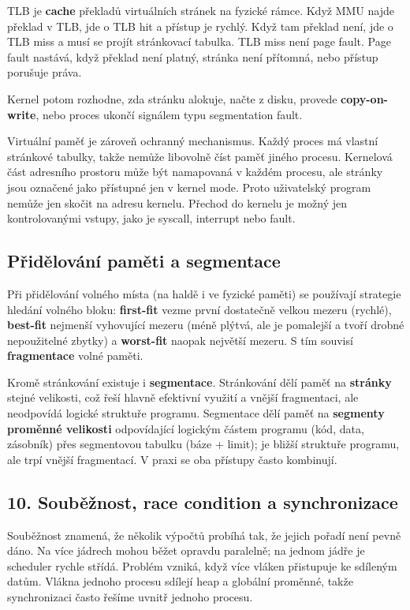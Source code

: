 TLB je \textbf{cache} překladů virtuálních stránek na fyzické rámce. Když MMU najde překlad v TLB, jde o TLB hit a přístup je rychlý. Když tam překlad není, jde o TLB miss a musí se projít stránkovací tabulka. TLB miss není page fault. Page fault nastává, když překlad není platný, stránka není přítomná, nebo přístup porušuje práva.

Kernel potom rozhodne, zda stránku alokuje, načte z disku, provede \textbf{copy-on-write}, nebo proces ukončí signálem typu segmentation fault.

Virtuální paměť je zároveň ochranný mechanismus. Každý proces má vlastní stránkové tabulky, takže nemůže libovolně číst paměť jiného procesu. Kernelová část adresního prostoru může být namapovaná v každém procesu, ale stránky jsou označené jako přístupné jen v kernel mode. Proto uživatelský program nemůže jen skočit na adresu kernelu. Přechod do kernelu je možný jen kontrolovanými vstupy, jako je syscall, interrupt nebo fault.

\subsection*{Přidělování paměti a segmentace}
Při přidělování volného místa (na haldě i ve fyzické paměti) se používají strategie hledání volného bloku: \textbf{first-fit} vezme první dostatečně velkou mezeru (rychlé), \textbf{best-fit} nejmenší vyhovující mezeru (méně plýtvá, ale je pomalejší a tvoří drobné nepoužitelné zbytky) a \textbf{worst-fit} naopak největší mezeru. S tím souvisí \textbf{fragmentace} volné paměti.

Kromě stránkování existuje i \textbf{segmentace}. Stránkování dělí paměť na \textbf{stránky} stejné velikosti, což řeší hlavně efektivní využití a vnější fragmentaci, ale neodpovídá logické struktuře programu. Segmentace dělí paměť na \textbf{segmenty proměnné velikosti} odpovídající logickým částem programu (kód, data, zásobník) přes segmentovou tabulku (báze + limit); je bližší struktuře programu, ale trpí vnější fragmentací. V praxi se oba přístupy často kombinují.

\subsection*{10. Souběžnost, race condition a synchronizace}

Souběžnost znamená, že několik výpočtů probíhá tak, že jejich pořadí není pevně dáno. Na více jádrech mohou běžet opravdu paralelně; na jednom jádře je scheduler rychle střídá. Problém vzniká, když více vláken přistupuje ke sdíleným datům. Vlákna jednoho procesu sdílejí heap a globální proměnné, takže synchronizaci často řešíme uvnitř jednoho procesu.

